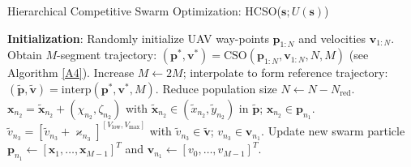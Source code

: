\documentclass[12pt, draftcls, onecolumn]{IEEEtran}
\theoremstyle{plain}
\theoremstyle{definition}
\theoremstyle{remark}
\begin{document}
\begin{algorithm}[t]
\caption{Hierarchical Competitive Swarm Optimization: HCSO($\mathbf{s};U(\mathbf{s})$)}\label{A3}
    \begin{algorithmic}[1]
    	\State \textbf{Initialization}: Randomly initialize UAV way-points $\mathbf{p}_{1:N}$ and velocities $\mathbf{v}_{1:N}$.
    	\vspace{.2cm}
    	    \vspace{.2cm}
    		\State Obtain $M$-segment trajectory: $(\mathbf{p}^{*},\mathbf{v}^{*})=\mathrm{CSO}(\mathbf{p}_{1:N},\mathbf v_{1:N},N,M)$ (see Algorithm \ref{A4}).
    		\vspace{.2cm}
    		\State Increase $M{\gets}2M$; interpolate to form reference trajectory: $(\tilde{\mathbf{p}},\tilde{\mathbf{v}}){=}\mathrm{interp}(\mathbf{p}^{*},\mathbf{v}^{*},M)$.
    		\vspace{.2cm}
    		\State Reduce population size $N{\gets}N{-}N_{\mathrm{red}}$.
    		\vspace{.2cm}
    		    \vspace{.2cm}
    			    \vspace{.2cm}
    			    \State $\mathbf{x}_{n_{2}}{=}\tilde{\mathbf{x}}_{n_{2}}{+}(\chi_{n_{2}},\zeta_{n_{2}})$ with $\tilde{\mathbf{x}}_{n_{2}}{\in}(\tilde{x}_{n_{2}},\tilde{y}_{n_{2}})$ in $\tilde{\mathbf{p}}$; $\mathbf{x}_{n_{2}}{\in}\mathbf{p}_{n_{1}}$.
    				\vspace{.2cm}
    			\EndFor
    			\vspace{.2cm}
    			    \vspace{.2cm}
    			    \State $\tilde{v}_{n_{3}}{=}[\tilde{v}_{n_{3}}{+}\varkappa_{n_{3}}]^{[V_{\mathrm{low}},V_{\mathrm{max}}]}$ with $\tilde{v}_{n_{3}}{\in}\tilde{\mathbf{v}}$; $v_{n_{3}}{\in}\mathbf{v}_{n_{1}}$.
    				\vspace{.2cm}
    			\EndFor
    			\vspace{.2cm}
    			\State Update new swarm particle $\mathbf p_{n_{1}}{\gets}[\mathbf{x}_{1},{\dots},\mathbf{x}_{M{-}1}]^{T}$ and $\mathbf{v}_{n_{1}}{\gets}[v_{0},{\dots},v_{M{-}1}]^{T}$.
    			\vspace{.2cm}
    		\EndFor
    		\vspace{.2cm}
    	\EndWhile
    \end{algorithmic}
\end{algorithm}
\end{document}
